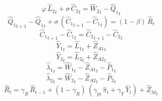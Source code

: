 \begin{dmath}
{{\varphi}}\, {{\hat{L}_{2}}}_{t}+{{\sigma}}\, {{\hat{C}_{2}}}_{t}={{\hat{W}_{2}}}_{t}-{{\hat{Q}_{1}}}_{t}
\end{dmath}
\begin{dmath}
{{\hat{Q}_{1}}}_{t+1}-{{\hat{Q}_{1}}}_{t}+{{\sigma}}\, \left({{\hat{C}_{1}}}_{t+1}-{{\hat{C}_{1}}}_{t}\right)=\left(1-{{\beta}}\right)\, {{\hat{R}}}_{t}
\end{dmath}
\begin{dmath}
{{\hat{C}_{1}}}_{t+1}-{{\hat{C}_{1}}}_{t}={{\hat{C}_{2}}}_{t+1}-{{\hat{C}_{2}}}_{t}
\end{dmath}
\begin{dmath}
{{\hat{Y}_{1}}}_{t}={{\hat{L}_{1}}}_{t}+{{\hat{Z}_{A1}}}_{t}
\end{dmath}
\begin{dmath}
{{\hat{Y}_{2}}}_{t}={{\hat{L}_{2}}}_{t}+{{\hat{Z}_{A2}}}_{t}
\end{dmath}
\begin{dmath}
{{\hat{\lambda}_{1}}}_{t}={{\hat{W}_{1}}}_{t}-{{\hat{Z}_{A1}}}_{t}-{{\hat{P}_{1}}}_{t}
\end{dmath}
\begin{dmath}
{{\hat{\lambda}_{2}}}_{t}={{\hat{W}_{2}}}_{t}-{{\hat{Z}_{A2}}}_{t}-{{\hat{P}_{2}}}_{t}
\end{dmath}
\begin{dmath}
{{\hat{R}}}_{t}={{\gamma_{R}}}\, {{\hat{R}}}_{t-1}+\left(1-{{\gamma_{R}}}\right)\, \left({{\gamma_{pi}}}\, {{\hat{\pi}}}_{t}+{{\gamma_{Y}}}\, {{\hat{Y}}}_{t}\right)+{{\hat{Z}_M}}_{t}
\end{dmath}
